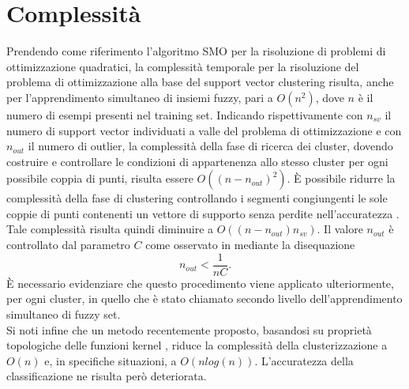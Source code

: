 \documentclass [11pt,a4paper,twoside,openright] {book}
\begin{document}
\section{Complessità}
Prendendo come riferimento l'algoritmo SMO \cite{platt1998sequential} per la risoluzione di problemi di ottimizzazione quadratici, la complessità temporale per la risoluzione del problema di ottimizzazione alla base del support vector clustering risulta, anche per l'apprendimento simultaneo di insiemi fuzzy, pari a $O(n^2)$, dove $n$ è il numero di esempi presenti nel training set. Indicando rispettivamente con $n_{sv}$ il numero di support vector individuati a valle del problema di ottimizzazione e con $n_{out}$ il numero di outlier, la complessità della fase di ricerca dei cluster, dovendo costruire e controllare le condizioni di appartenenza allo stesso cluster per ogni possibile coppia di punti, risulta essere $O((n-n_{out})^2)$. È possibile ridurre la complessità della fase di clustering controllando i segmenti congiungenti le sole coppie di punti contenenti un vettore di supporto senza perdite nell'accuratezza \cite{ben2001support}. Tale complessità risulta quindi diminuire a $O((n-n_{out})n_{sv})$. Il valore $n_{out}$ è controllato dal parametro $C$ come osservato in \cite{ben2001support} mediante la disequazione 
\begin{equation}
n_{out} < \dfrac{1}{nC}.
\end{equation}
È necessario evidenziare che questo procedimento viene applicato ulteriormente, per ogni cluster, in quello che è stato chiamato secondo livello dell'apprendimento simultaneo di fuzzy set.\\
Si noti infine che un metodo recentemente proposto, basandosi su proprietà topologiche delle funzioni kernel \cite{lee2005improved}, riduce la complessità della clusterizzazione a $O(n)$ e, in specifiche situazioni, a $O(nlog(n))$.  L'accuratezza della classificazione ne risulta però deteriorata.
\end{document}
